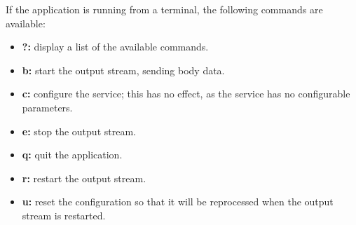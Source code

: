 If the application is running from a terminal, the following commands are available:
\begin{itemize}
\item \textbf{?:} display a list of the available commands.
\item \textbf{b:} start the output stream, sending body data. 
\item \textbf{c:} configure the service; this has no effect, as the service has no
configurable parameters. 
\item \textbf{e:} stop the output stream. 
\item \textbf{q:} quit the application. 
\item \textbf{r:} restart the output stream. 
\item \textbf{u:} reset the configuration so that it will be reprocessed when the output
stream is restarted.
\end{itemize}
\primaryEnd{}
